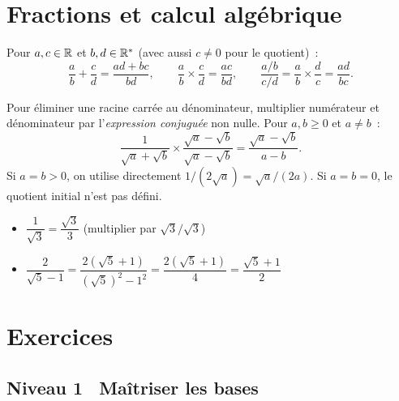 \section{Fractions et calcul alg\'ebrique}

\begin{prop}
Pour $a,c\in\mathbb{R}$ et $b,d\in\mathbb{R}^*$ (avec aussi $c\ne0$ pour le quotient)~:
$$\frac{a}{b} + \frac{c}{d} = \frac{ad+bc}{bd},\qquad
  \frac{a}{b} \times \frac{c}{d} = \frac{ac}{bd},\qquad
  \frac{a/b}{c/d} = \frac{a}{b} \times \frac{d}{c} = \frac{ad}{bc}.$$
\end{prop}

\begin{methode}
Pour \'eliminer une racine carr\'ee au d\'enominateur, multiplier num\'erateur
et d\'enominateur par l'\emph{expression conjugu\'ee} non nulle.
Pour $a,b\geq0$ et $a\ne b$~:
$$\frac{1}{\sqrt{a}+\sqrt{b}} \times \frac{\sqrt{a}-\sqrt{b}}{\sqrt{a}-\sqrt{b}}
  = \frac{\sqrt{a}-\sqrt{b}}{a-b}.$$
Si $a=b>0$, on utilise directement $1/(2\sqrt a)=\sqrt a/(2a)$.
Si $a=b=0$, le quotient initial n'est pas d\'efini.
\end{methode}

\begin{ex}[Rationalisations]
\begin{itemize}
  \item $\dfrac{1}{\sqrt{3}} = \dfrac{\sqrt{3}}{3}$ \quad
        (multiplier par $\sqrt{3}/\sqrt{3}$)
  \item $\dfrac{2}{\sqrt{5}-1} = \dfrac{2(\sqrt{5}+1)}{(\sqrt{5})^2-1^2}
        = \dfrac{2(\sqrt{5}+1)}{4} = \dfrac{\sqrt{5}+1}{2}$
\end{itemize}
\end{ex}

\section{Exercices}

\subsection*{\quad Niveau 1 \textemdash\ Ma\^itriser les bases}

